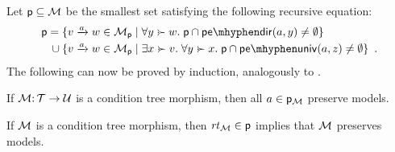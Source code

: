 %
Let ${\mathsf{p}}\subseteq {\mathcal{M}}$ be the smallest set satisfying the following recursive equation:
%
\begin{align*}
 \pgen = {} & \gensetof{\trip vaw\in \cM_\pgen}{\forall y\childof w\st \pgen\cap \pedir{a,y}\neq\emptyset} \\
   {}\cup{} & \gensetof{\trip vaw\in \cM_\pgen}{\exists x\childof v\st \forall y\childof x\st \pgen\cap \peuniv{a,z}\neq\emptyset} \enspace.
\end{align*}
%
The following can now be proved by induction, analogously to .
%
\begin{lemma}\label{lem:preservation}
If ${\mathcal{M}}{:}\,{\mathcal{T}}\rightarrow {\mathcal{U}}$ is a condition tree morphism, then all $a\in {\mathsf{p}}_{\mathcal{M}}$ preserve models.
\end{lemma}
%
\begin{corollary}
If ${\mathcal{M}}$ is a condition tree morphism, then $\mathit{rt}_{{\mathcal{M}}}\in{\mathsf{p}}$ implies that ${\mathcal{M}}$ preserves models.
\end{corollary}